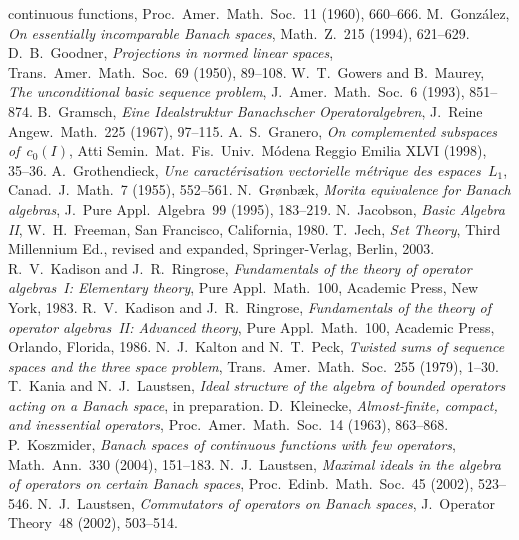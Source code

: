 \documentclass[12pt]{amsart}
\theoremstyle{definition}
\numberwithin{equation}{section}
\begin{document}
\begin{thebibliography}{99}
{  continuous functions}, {Proc.\ Amer.\ Math.\ Soc.}~{11}
  (1960), 660--666.
 M.~Gonz\'{a}lez, \emph{On essentially incomparable
    Banach spaces}, {Math.~Z.}~{215} (1994), 621--629.
 D.~B.~Goodner, \emph{Projections in normed linear spaces},
  {Trans.\ Amer.\ Math.\ Soc.}~{69} (1950), 89--108.
 W.~T.~Gowers and B.~Maurey, \emph{The unconditional basic
    sequence problem}, {J.~Amer.\ Math.\ Soc.}~{6} (1993), 851--874.
 B.~Gramsch, \emph{Eine Idealstruktur Banachscher
    Operatoralgebren}, {J.~Reine Angew.\ Math.}~{225} (1967), 97--115.
 A.~S.~Granero, \emph{On complemented subspaces
  of~$c_0(I)$}, {Atti Semin.\ Mat.\ Fis.\ Univ.\ M\'{o}dena Reggio Emilia}
  {XLVI} (1998), 35--36.
 A.~Grothendieck, \emph{Une caract\'{e}risation
    vectorielle m\'{e}trique des espaces~$L_1$}, {Canad.\
    J.~Math.}~{7} (1955), 552--561.
 N.~Gr\o{}nb\ae{}k, \emph{Morita equivalence
    for Banach algebras}, {J.~Pure Appl.\ Algebra}~{99} (1995),
  183--219.
 N.~Jacobson, \emph{Basic Algebra II},
  W.\ H.\ Freeman, San Francisco, California, 1980.
 T.~Jech, \emph{Set Theory}, Third Millennium Ed.,
  revised and expanded, Springer-Verlag, Berlin, 2003.
 R.~V.~Kadison and J.~R.~Ringrose, \emph{Fundamentals of
    the theory of operator alge\-bras~I: Elementary theory},  Pure 
  Appl.\ Math.~100, Academic Press, New York, 1983.
 R.~V.~Kadison and J.~R.~Ringrose, \emph{Fundamentals of
    the theory of operator alge\-bras~II: Advanced theory}, Pure Appl.\
  Math.~100, Academic Press, Orlando, Florida, 1986.
\bibitem{kaltonpeck} N.~J.~Kalton and N.~T.~Peck, \emph{Twisted sums
    of sequence spaces and the three space problem}, {Trans.\ Amer.\
    Math.\ Soc.}~{255} (1979), 1--30.
\bibitem{kanialaustsen} T.~Kania and N.~J.~Laustsen, \emph{Ideal
    structure of the algebra of bounded operators acting on a Banach
    space}, in preparation.
\bibitem{kl} D.~Kleinecke, \emph{Almost-finite, compact, and
    inessential operators}, {Proc.\ Amer.\ Math.\ Soc.}~{14} (1963),
  863--868.
\bibitem{koszmider} P.~Koszmider, \emph{Banach spaces of continuous
    functions with few operators}, {Math.\ Ann.}~{330} (2004),
  151--183.
\bibitem{lau1} N.~J.~Laustsen, \emph{Maximal ideals in the algebra of
    operators on certain Banach spaces}, {Proc.\ Edinb.\ Math.\
    Soc.}~{45} (2002), 523--546.
 N.~J.~Laustsen, \emph{Commutators of operators on Banach
  spaces}, {J.~Operator Theory}~{48} (2002), 503--514.

\end{thebibliography}
\end{document}
